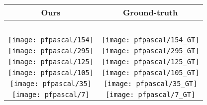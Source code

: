 \documentclass{article}
\begin{document}
\begin{figure}[tbp]
  \centering
  \begingroup
  \renewcommand{\arraystretch}{0.5}
  \begin{tabular}{@{\hskip 1pt}c@{\hskip 6pt}|@{\hskip 6pt}c@{\hskip 1pt}}
    Ours & Ground-truth \\ \hline
    ~ & ~ \\
\texttt{[image: pfpascal/154]}  & 
\texttt{[image: pfpascal/154\_GT]} \\
\texttt{[image: pfpascal/295]}  & 
\texttt{[image: pfpascal/295\_GT]} \\
\texttt{[image: pfpascal/125]}  & 
\texttt{[image: pfpascal/125\_GT]} \\
\texttt{[image: pfpascal/105]}  & 
\texttt{[image: pfpascal/105\_GT]} \\
\texttt{[image: pfpascal/35]}  & 
\texttt{[image: pfpascal/35\_GT]} \\
\texttt{[image: pfpascal/7]}  & 
\texttt{[image: pfpascal/7\_GT]} \\



\end{tabular}
\end{figure}
\end{document}
